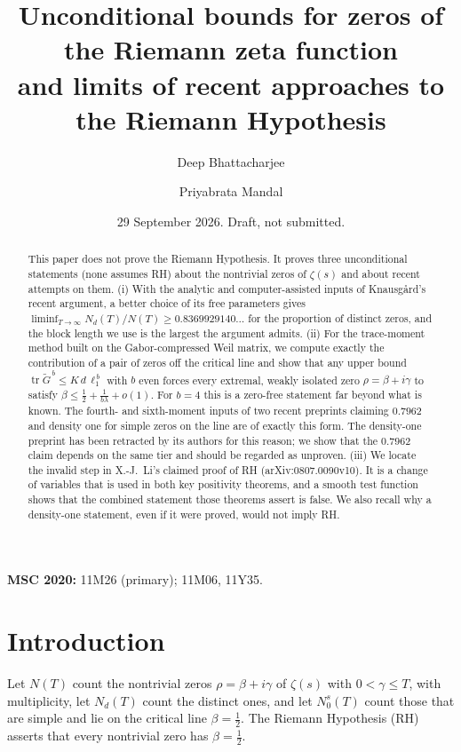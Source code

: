 \documentclass[reqno,11pt]{amsart}
\title[Zeta zeros: unconditional bounds and limits of recent approaches]{Unconditional bounds for zeros of the Riemann zeta function\\ and limits of recent approaches to the Riemann Hypothesis}
\author{Deep Bhattacharjee}
\author{Priyabrata Mandal}
\date{29 September 2026. Draft, not submitted.}
\numberwithin{equation}{section}
\theoremstyle{plain}
\theoremstyle{remark}
\DeclareMathOperator{\tr}{tr}
\begin{document}
\begin{abstract}
This paper does not prove the Riemann Hypothesis. It proves three
unconditional statements (none assumes RH) about the nontrivial zeros of
$\zeta(s)$ and about recent attempts on them.
(i) With the analytic and computer-assisted inputs of Knausg{\aa}rd's recent
argument, a better choice of its free parameters gives
$\liminf_{T\to\infty}N_d(T)/N(T)\ge 0.8369929140\ldots$ for the proportion of
distinct zeros, and the block length we use is the largest the argument
admits.
(ii) For the trace-moment method built on the Gabor-compressed Weil matrix, we
compute exactly the contribution of a pair of zeros off the critical line and
show that any upper bound $\tr\widetilde G^{\,b}\le K\,d\,\ell_1^{\,b}$ with $b$
even forces every extremal, weakly isolated zero $\rho=\beta+i\gamma$ to satisfy
$\beta\le\frac12+\frac1{b\lambda}+o(1)$. For $b=4$ this is a zero-free
statement far beyond what is known. The fourth- and sixth-moment inputs of two
recent preprints claiming $0.7962$ and density one for simple zeros on the
line are of exactly this form. The density-one preprint has been retracted by
its authors for this reason; we show that the $0.7962$ claim depends on the same
tier and should be regarded as unproven.
(iii) We locate the invalid step in X.-J.~Li's claimed proof of RH
(arXiv:0807.0090v10). It is a change of variables that is used in both key
positivity theorems, and a smooth test function shows that the combined
statement those theorems assert is false.
We also recall why a density-one statement, even if it were proved, would not
imply RH.
\end{abstract}

\maketitle

\noindent\textbf{MSC 2020:} 11M26 (primary); 11M06, 11Y35.

\section{Introduction}

Let $N(T)$ count the nontrivial zeros $\rho=\beta+i\gamma$ of $\zeta(s)$ with
$0<\gamma\le T$, with multiplicity, let $N_d(T)$ count the distinct ones, and
let $N_0^{s}(T)$ count those that are simple and lie on the critical line
$\beta=\frac12$. The Riemann Hypothesis (RH) asserts that every nontrivial zero
has $\beta=\frac12$.
\end{document}
